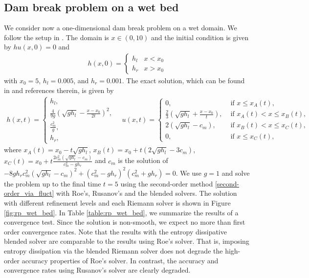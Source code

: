 \documentclass[preprint, 11pt]{article}
\begin{document}
\subsection{Dam break problem on a wet bed}\label{sec:rp_wet_bed}
We consider now a one-dimensional dam break problem on a wet domain.
We follow the setup in \cite[\S 4.1.1]{delestre2013swashes}.
The domain is $x\in(0,10)$ and the initial condition is given by
$hu(x,0)=0$ and
\begin{align*}
  h(x,0) =
  \begin{cases}
    h_l & x < x_0 \\
    h_r & x > x_0
  \end{cases}
\end{align*}
with $x_0=5$, $h_l=0.005$, and $h_r=0.001$.  The exact solution, which can be found in
\cite{delestre2013swashes} and references therein, is given by
\begin{align*}
  h(x,t) =
  \begin{cases}
    h_l, \\
    \frac{4}{9g}\left(\sqrt{gh_l}-\frac{x-x_0}{2t}\right)^2, \\
    \frac{c_m^2}{g}, \\
    h_r,
  \end{cases}
\quad
  u(x,t) =
  \begin{cases}
    0, &\mbox{ if } x\leq x_A(t), \\
    \frac{2}{3}\left(\sqrt{gh_l}+\frac{x-x_0}{t}\right), & \mbox{ if } x_A(t) < x\leq x_B(t), \\
    2(\sqrt{gh_l}-c_m), & \mbox{ if } x_B(t)<x\leq x_C(t), \\
    0, &\mbox{ if } x\leq x_C(t),
  \end{cases}
\end{align*}
where $x_A(t)=x_0-t\sqrt{gh_l}$, $x_B(t)=x_0+t\left(2\sqrt{gh_l}-3c_m\right)$,
$x_C(t)=x_0+t\frac{2c_m^2\left(\sqrt{gh_l}-c_m\right)}{c_m^2-gh_r}$ and
$c_m$ is the solution of
$-8gh_rc_m^2\left(\sqrt{gh_l}-c_m\right)^2+\left(c_m^2-gh_r\right)^2\left(c_m^2+gh_r\right)=0$.
We use $g=1$ and solve the problem up to the final time $t=5$ using the
second-order method \eqref{second-order_via_fluct}
with Roe's, Rusanov's and the blended solvers. The solution with different refinement levels
and each Riemann solver is shown in Figure \ref{fig:rp_wet_bed}.
In Table \ref{table:rp_wet_bed}, we summarize the results of a convergence test.
Since the solution is non-smooth, we expect no more than first order convergence rates. Note that the
results with the entropy dissipative blended solver are comparable to the results using Roe's solver.
That is, imposing entropy dissipation via the blended Riemann solver does not degrade the high-order
accuracy properties of Roe's solver.
In contrast, the accuracy and convergence rates using Rusanov's solver are clearly degraded.
\end{document}
